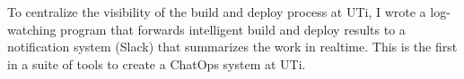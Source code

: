 {
  To centralize the visibility of the build and deploy process at UTi, I wrote a log-watching program that forwards intelligent build and deploy results to a notification system (Slack) that summarizes the work in realtime. This is the first in a suite of tools to create a ChatOps system at UTi.
}
